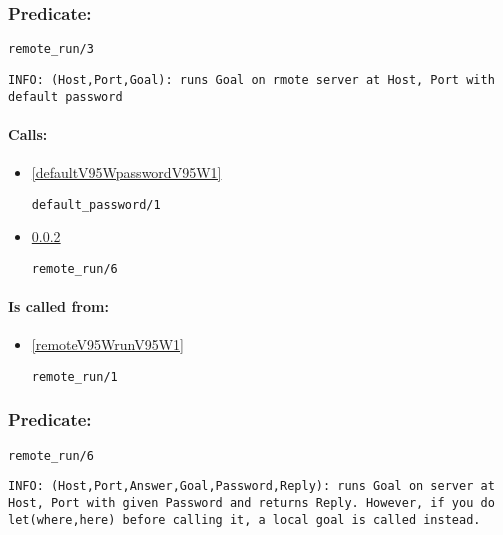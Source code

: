 \subsubsection{Predicate:} \label{remoteV95WrunV95W3}

\begin{verbatim}
remote_run/3
\end{verbatim}

{\small \begin{verbatim}
INFO: (Host,Port,Goal): runs Goal on rmote server at Host, Port with default password

\end{verbatim}}
\paragraph{Calls:} 
\begin{itemize}
\item \ref{defaultV95WpasswordV95W1} 
\begin{verbatim}
default_password/1
\end{verbatim}

\item \ref{remoteV95WrunV95W6} 
\begin{verbatim}
remote_run/6
\end{verbatim}

\end{itemize}
\paragraph{Is called from:} 
\begin{itemize}
\item \ref{remoteV95WrunV95W1} 
\begin{verbatim}
remote_run/1
\end{verbatim}

\end{itemize}

\subsubsection{Predicate:} \label{remoteV95WrunV95W6}

\begin{verbatim}
remote_run/6
\end{verbatim}

{\small \begin{verbatim}
INFO: (Host,Port,Answer,Goal,Password,Reply): runs Goal on server at Host, Port with given Password and returns Reply. However, if you do let(where,here) before calling it, a local goal is called instead.

\end{verbatim}}

